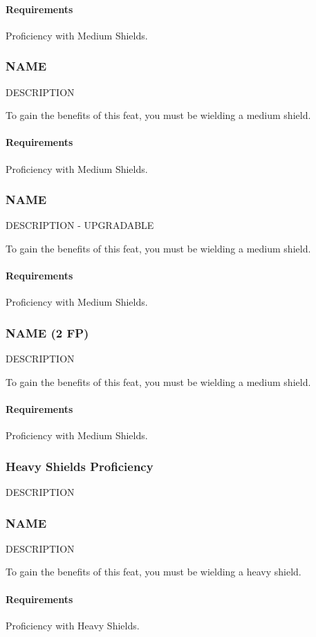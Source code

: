     \paragraph{Requirements} Proficiency with Medium Shields.
\subsubsection{NAME} \label{feat::name}
    DESCRIPTION

    To gain the benefits of this feat, you must be wielding a medium shield.
    \paragraph{Requirements} Proficiency with Medium Shields.
\subsubsection{NAME} \label{feat::name}
    DESCRIPTION - UPGRADABLE

    To gain the benefits of this feat, you must be wielding a medium shield.
    \paragraph{Requirements} Proficiency with Medium Shields.
\subsubsection{NAME (2 FP)} \label{feat::name}
    DESCRIPTION

    To gain the benefits of this feat, you must be wielding a medium shield.
    \paragraph{Requirements} Proficiency with Medium Shields.
\subsubsection{Heavy Shields Proficiency} \label{feat::name}
    DESCRIPTION
\subsubsection{NAME} \label{feat::name}
    DESCRIPTION

    To gain the benefits of this feat, you must be wielding a heavy shield.
    \paragraph{Requirements} Proficiency with Heavy Shields.
